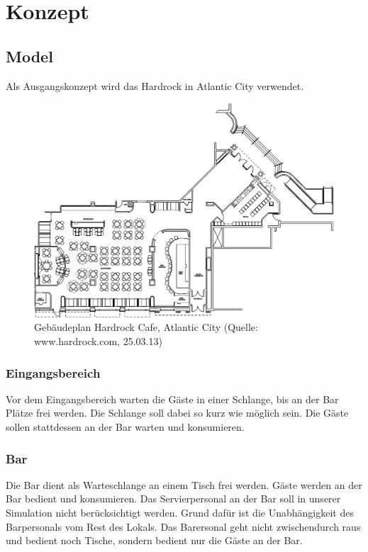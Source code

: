 \documentclass[ngerman,a4paper,12pt]{scrreprt}
\begin{document}
\tableofcontents


\chapter{Konzept}


\section{Model}
Als Ausgangskonzept wird das Hardrock in Atlantic City verwendet.
\begin{figure}[htp]
	\centering
		\includegraphics[width=1\textwidth]{img/hardrock-plan.png}
		\caption[Gebäudeplan Hardrock]{Gebäudeplan Hardrock Cafe, Atlantic City (Quelle: www.hardrock.com, 25.03.13)}
		\label{planHardrock}
\end{figure}

\subsection{Eingangsbereich}
Vor dem Eingangsbereich warten die Gäste in einer Schlange, bis an der Bar Plätze frei werden. Die Schlange soll dabei so kurz wie möglich sein. Die Gäste sollen stattdessen an der Bar warten und konsumieren.

\subsection{Bar}
Die Bar dient als Warteschlange an einem Tisch frei werden. Gäste werden an der Bar bedient und konsumieren.
Das Servierpersonal an der Bar soll in unserer Simulation nicht berücksichtigt werden. Grund dafür ist die Unabhängigkeit des Barpersonals vom Rest des Lokals. Das Barersonal geht nicht zwischendurch raus und bedient noch Tische, sondern bedient nur die Gäste an der Bar.
\end{document}
